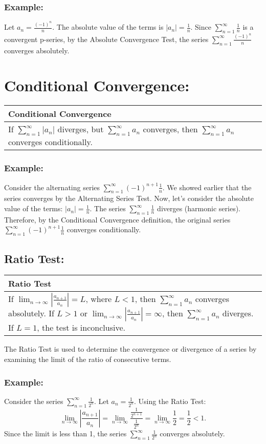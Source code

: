 \documentclass[12pt]{article}
\newcommand{\formula}[2]{
    {\renewcommand{\arraystretch}{2}
        \begin{center}
        \begin{tabular}{|p{0.9\textwidth}|}
        \hline
        \textbf{#1} \\
        \hline
        #2 \\
        \hline
        \end{tabular}
        \end{center}
    }
}
\begin{document}
\subsubsection{Example: }
Let $a_n = \frac{(-1)^n}{n}$. The absolute value of the terms is $|a_n| = \frac{1}{n}$. Since $\sum_{n=1}^{\infty} \frac{1}{n}$ is a convergent p-series, by the Absolute Convergence Test, the series $\sum_{n=1}^{\infty} \frac{(-1)^n}{n}$ converges absolutely.

\vspace{\baselineskip}
\vspace{\baselineskip}

\section{Conditional Convergence: }
\formula{Conditional Convergence}{
    If $\sum_{n=1}^{\infty} |a_n|$ diverges, but $\sum_{n=1}^{\infty} a_n$ converges, then $\sum_{n=1}^{\infty} a_n$ converges conditionally.
}
\subsubsection{Example: }
Consider the alternating series $\sum_{n=1}^{\infty} (-1)^{n+1}\frac{1}{n}$. We showed earlier that the series converges by the Alternating Series Test. Now, let's consider the absolute value of the terms: $|a_n| = \frac{1}{n}$. The series $\sum_{n=1}^{\infty} \frac{1}{n}$ diverges (harmonic series). Therefore, by the Conditional Convergence definition, the original series $\sum_{n=1}^{\infty} (-1)^{n+1}\frac{1}{n}$ converges conditionally.

\vspace{\baselineskip}

\subsection{Ratio Test: }
\formula{Ratio Test}{
    If $\lim_{n \to \infty} \left| \frac{a_{n+1}}{a_n} \right| = L$, where $L < 1$, then $\sum_{n=1}^{\infty} a_n$ converges absolutely. If $L > 1$ or $\lim_{n \to \infty} \left| \frac{a_{n+1}}{a_n} \right| = \infty$, then $\sum_{n=1}^{\infty} a_n$ diverges. If $L = 1$, the test is inconclusive.
}
The Ratio Test is used to determine the convergence or divergence of a series by examining the limit of the ratio of consecutive terms.
\subsubsection{Example: }
Consider the series $\sum_{n=1}^{\infty} \frac{1}{2^n}$. Let $a_n = \frac{1}{2^n}$. Using the Ratio Test:
\[
\lim_{n \to \infty} \left| \frac{a_{n+1}}{a_n} \right| = \lim_{n \to \infty} \frac{\frac{1}{2^{n+1}}}{\frac{1}{2^n}} = \lim_{n \to \infty} \frac{1}{2} = \frac{1}{2} < 1.
\]
Since the limit is less than 1, the series $\sum_{n=1}^{\infty} \frac{1}{2^n}$ converges absolutely.
\end{document}
